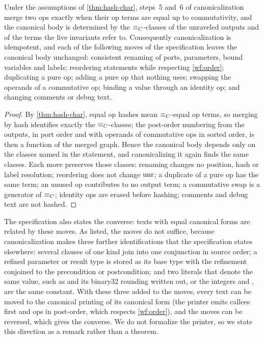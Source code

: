 \begin{corollary}\label{cor:canon}
Under the assumptions of \cref{thm:hash-char}, steps~5 and~6 of canonicalization merge two ops
exactly when their op terms are equal up to commutativity, and the canonical body is
determined by the $\equiv_{C}$-classes of the unraveled outputs and of the terms the live invariants
refer to. Consequently canonicalization is idempotent, and each of the following moves of the
specification leaves the canonical body unchanged: consistent renaming of ports, parameters,
bound variables and labels; reordering statements while respecting \ref{wf:order}; duplicating
a pure op; adding a pure op that nothing uses; swapping the operands of a commutative op;
binding a value through an identity op; and changing comments or debug text.
\end{corollary}
\begin{proof}
By \cref{thm:hash-char}, equal op hashes mean $\equiv_{C}$-equal op terms, so merging by hash
identifies exactly the $\equiv_{C}$-classes; the post-order numbering from the outputs, in port order
and with operands of commutative ops in sorted order, is then a function of the merged graph.
Hence the canonical body depends only on the classes named in the statement, and
canonicalizing it again finds the same classes. Each move preserves those classes: renaming
changes no position, hash or label resolution; reordering does not change $\mathrm{unr}$; a duplicate
of a pure op has the same term; an unused op contributes to no output term; a commutative swap
is a generator of $\equiv_{C}$; identity ops are erased before hashing; comments and debug text are
not hashed.
\end{proof}

The specification also states the converse: texts with equal canonical forms are related by
these moves. As listed, the moves do not suffice, because canonicalization makes three further
identifications that the specification states elsewhere: several clauses of one kind join into
one conjunction in source order; a refined parameter or result type is stored as its base type
with the refinement conjoined to the precondition or postcondition; and two literals that
denote the same value, such as  and its binary32 rounding written out, or the integers
 and , are the same constant. With these three added to the moves, every text can be
moved to the canonical printing of its canonical form (the printer emits callees first and ops in
post-order, which respects \ref{wf:order}), and the moves can be reversed, which gives the
converse. We do not formalize the printer, so we state this direction as a remark rather than a
theorem.

